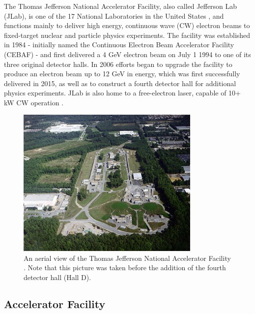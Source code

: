 The Thomas Jefferson National Accelerator Facility, also called Jefferson Lab (JLab), is one of the 17 National Laboratories in the United States \parencite{DepartmentofEnergy2023DepartmentLaboratories}, and functions mainly to deliver high energy, continuous wave (CW) electron beams to fixed-target nuclear and particle physics experiments. The facility was established in 1984 - initially named the Continuous Electron Beam Accelerator Facility (CEBAF) - and first delivered a 4 GeV electron beam on July 1 1994 to one of its three original detector halls. In 2006 efforts began to upgrade the facility to produce an electron beam up to 12 GeV in energy, which was first successfully delivered in 2015, as well as to construct a fourth detector hall for additional physics experiments\parencite{JeffersonLab2023AboutLab}. JLab is also home to a free-electron laser, capable of 10+ kW CW operation \parencite{Benson2007HighAccelerator}. 

\begin{figure}[ht]
    \centering
    \includegraphics[width=0.8\textwidth]{Chapters/Ch2-Experiment/accel_and_beamline/pics/CEBAF/jlab_wiki.png}
    \caption[Aerial View of JLab]{An aerial view of the Thomas Jefferson National Accelerator Facility \parencite{Wang2010CEBAFOverview}. Note that this picture was taken before the addition of the fourth detector hall (Hall D).}
    \label{fig:jlab_wiki}
\end{figure}

\subsection{Accelerator Facility}
    
